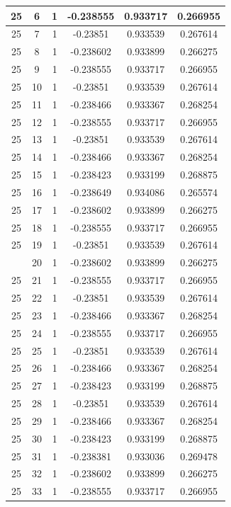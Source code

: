 \documentclass[12pt,a4paper]{article}
\numberwithin{equation}{section}
\numberwithin{figure}{section}
\numberwithin{table}{section}
\begin{document}
\begin{longtable}{|c|c|c|c|c|c|}
25 & 6 & 1 & -0.238555 & 0.933717 & 0.266955 \\ \hline
25 & 7 & 1 & -0.23851 & 0.933539 & 0.267614 \\ \hline
25 & 8 & 1 & -0.238602 & 0.933899 & 0.266275 \\ \hline
25 & 9 & 1 & -0.238555 & 0.933717 & 0.266955 \\ \hline
25 & 10 & 1 & -0.23851 & 0.933539 & 0.267614 \\ \hline
25 & 11 & 1 & -0.238466 & 0.933367 & 0.268254 \\ \hline
25 & 12 & 1 & -0.238555 & 0.933717 & 0.266955 \\ \hline
25 & 13 & 1 & -0.23851 & 0.933539 & 0.267614 \\ \hline
25 & 14 & 1 & -0.238466 & 0.933367 & 0.268254 \\ \hline
25 & 15 & 1 & -0.238423 & 0.933199 & 0.268875 \\ \hline
25 & 16 & 1 & -0.238649 & 0.934086 & 0.265574 \\ \hline
25 & 17 & 1 & -0.238602 & 0.933899 & 0.266275 \\ \hline
25 & 18 & 1 & -0.238555 & 0.933717 & 0.266955 \\ \hline
25 & 19 & 1 & -0.23851 & 0.933539 & 0.267614 \\ \hline
\pagebreak
25 & 20 & 1 & -0.238602 & 0.933899 & 0.266275 \\ \hline
25 & 21 & 1 & -0.238555 & 0.933717 & 0.266955 \\ \hline
25 & 22 & 1 & -0.23851 & 0.933539 & 0.267614 \\ \hline
25 & 23 & 1 & -0.238466 & 0.933367 & 0.268254 \\ \hline
25 & 24 & 1 & -0.238555 & 0.933717 & 0.266955 \\ \hline
25 & 25 & 1 & -0.23851 & 0.933539 & 0.267614 \\ \hline
25 & 26 & 1 & -0.238466 & 0.933367 & 0.268254 \\ \hline
25 & 27 & 1 & -0.238423 & 0.933199 & 0.268875 \\ \hline
25 & 28 & 1 & -0.23851 & 0.933539 & 0.267614 \\ \hline
25 & 29 & 1 & -0.238466 & 0.933367 & 0.268254 \\ \hline
25 & 30 & 1 & -0.238423 & 0.933199 & 0.268875 \\ \hline
25 & 31 & 1 & -0.238381 & 0.933036 & 0.269478 \\ \hline
25 & 32 & 1 & -0.238602 & 0.933899 & 0.266275 \\ \hline
25 & 33 & 1 & -0.238555 & 0.933717 & 0.266955 \\ \hline

\end{longtable}
\end{document}
